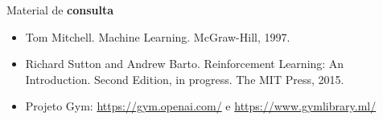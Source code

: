 \documentclass{beamer}
\begin{document}
\begin{frame}{Material de \textbf{consulta}}
\begin{itemize}
  \item Tom Mitchell. Machine Learning. McGraw-Hill, 1997.
  \item Richard Sutton and Andrew Barto. Reinforcement Learning: An Introduction. Second Edition, in progress. The MIT Press, 2015.
  \item Projeto Gym: \href{https://gym.openai.com/}{https://gym.openai.com/} e \href{https://www.gymlibrary.ml/}{https://www.gymlibrary.ml/}
\end{itemize}
\end{frame}
\end{document}
